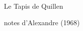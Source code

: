 \begin{center}
{\Large Le Tapis de Quillen}
\end{center}

\begin{flushright}
notes d'Alexandre (1968)
\end{flushright}

